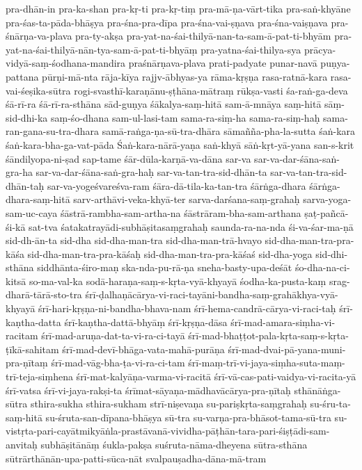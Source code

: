 {{pra-dhān-in
pra-ka-shan
pra-kṛ-ti
pra-kṛ-tiṃ
pra-mā-ṇa-vārt-tika
pra-saṅ-khyāne
pra-śas-ta-pāda-bhāṣya
pra-śna-pra-dīpa
pra-śna-vai-ṣṇava
pra-śna-vaiṣṇava
pra-śnārṇa-va-plava
pra-ty-akṣa
pra-yat-na-śai-thilyā-nan-ta-sam-ā-pat-ti-bhyām
pra-yat-na-śai-thilyā-nān-tya-sam-ā-pat-ti-bhyāṃ
pra-yatna-śai-thilya-sya
prācya-vidyā-saṃ-śodhana-mandira
praśnārṇava-plava
prati-padyate
punar-navā
puṇya-pattana
pūrṇi-mā-nta
rāja-kīya
rajjv-ābhyas-ya
rāma-kṛṣṇa
rasa-ratnā-kara
rasa-vai-śeṣika-sūtra
rogi-svasthī-karaṇānu-ṣṭhāna-mātraṃ
rūkṣa-vasti
śa-raṅ-ga-deva
śā-rī-ra
śā-rī-ra-sthāna
sād-guṇya
śākalya-saṃ-hitā
sam-ā-mnāya
saṃ-hitā
sāṃ-sid-dhi-ka
saṃ-śo-dhana
sam-ul-lasi-tam
sama-ra-siṃ-ha
sama-ra-siṃ-haḥ
sama-ran-gana-su-tra-dhara
samā-raṅga-ṇa-sū-tra-dhāra
sāmañña-pha-la-sutta
śaṅ-kara
śaṅ-kara-bha-ga-vat-pāda
Śaṅ-kara-nārā-yaṇa
saṅ-khyā
sāṅ-kṛt-yā-yana
san-s-krit
śāndilyopa-ni-ṣad
sap-tame
śār-dūla-karṇā-va-dāna
sar-va
sar-va-dar-śāna-saṅ-gra-ha
sar-va-dar-śāna-saṅ-gra-haḥ
sar-va-tan-tra-sid-dhān-ta
sar-va-tan-tra-sid-dhān-taḥ
sar-va-yogeśvareśva-ram
śāra-dā-tila-ka-tan-tra
śārṅga-dhara
śārṅga-dhara-saṃ-hitā
sarv-arthāvi-veka-khyā-ter
sarva-darśana-saṃ-grahaḥ
sarva-yoga-sam-uc-caya
śāstrā-rambha-sam-artha-na
śāstrāram-bha-sam-arthana
ṣaṭ-pañcā-śi-kā
sat-tva
śatakatrayādi-subhāṣitasaṃgrahaḥ
saunda-ra-na-nda
śi-va-śar-ma-ṇā
sid-dh-ān-ta
sid-dha
sid-dha-man-tra
sid-dha-man-trā-hvayo
sid-dha-man-tra-pra-kāśa
sid-dha-man-tra-pra-kāśaḥ
sid-dha-man-tra-pra-kāśaś
sid-dha-yoga
sid-dhi-sthāna
siddhānta-śiro-maṇ
ska-nda-pu-rā-ṇa
sneha-basty-upa-deśāt
śo-dha-na-ci-kitsā
so-ma-val-ka
sodā-haraṇa-saṃ-s-kṛta-vyā-khyayā
śodha-ka-pusta-kaṃ
srag-dharā-tārā-sto-tra
śrī-ḍalhaṇācārya-vi-raci-tayāni-bandha-saṃ-grahākhya-vyā-khyayā
śrī-hari-kṛṣṇa-ni-bandha-bhava-nam
śrī-hema-candrā-cārya-vi-raci-taḥ
śrī-kaṇtha-datta
śrī-kaṇtha-dattā-bhyāṃ
śrī-kṛṣṇa-dāsa
śrī-mad-amara-siṃha-vi-racitam
śrī-mad-aruṇa-dat-ta-vi-ra-ci-tayā
śrī-mad-bhaṭṭot-pala-kṛta-saṃ-s-kṛta-ṭīkā-sahitam
śrī-mad-devī-bhāga-vata-mahā-purāṇa
śrī-mad-dvai-pā-yana-muni-pra-ṇītaṃ
śrī-mad-vāg-bha-ṭa-vi-ra-ci-tam
śrī-maṃ-trī-vi-jaya-siṃha-suta-maṃ-trī-teja-siṃhena
śrī-mat-kalyāṇa-varma-vi-racitā
śrī-vā-cas-pati-vaidya-vi-racita-yā
śrī-vatsa
śrī-vi-jaya-rakṣi-ta
śrīmat-sāyaṇa-mādhavācārya-pra-ṇītaḥ
sthānāṅga-sūtra
sthira-sukha
sthira-sukham
strī-niṣevaṇa
su-pariṣkṛta-saṃgrahaḥ
su-śru-ta-saṃ-hitā
su-śruta-san-dīpana-bhāṣya
sū-tra
su-varṇa-pra-bhāsot-tama-sū-tra
su-vistṛta-pari-cayātmikyāṅla-prastāvanā-vividha-pāṭhān-tara-pari-śiṣṭādi-sam-anvitaḥ
subhāṣitānāṃ
śukla-pakṣa
suśruta-nāma-dheyena
sūtra-sthāna
sūtrārthānān-upa-patti-sūca-nāt
svalpauṣadha-dāna-mā-tram
}}
